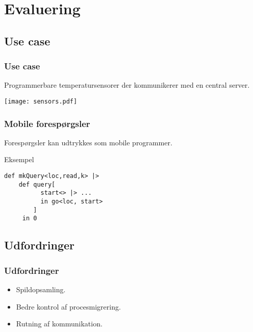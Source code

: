 \documentclass{beamer}
\begin{document}
\section{Evaluering}

\subsection{Use case}
\begin{frame}
\frametitle{Use case}
Programmerbare temperatursensorer der kommunikerer med en central server.
\begin{center}
\texttt{[image: sensors.pdf]}
\end{center}
\end{frame}

\begin{frame}[fragile]
\frametitle{Mobile forespørgsler}
Forespørgsler kan udtrykkes som mobile programmer.
\begin{block}{Eksempel}
\begin{lstlisting}
def mkQuery<loc,read,k> |>
    def query[
          start<> |> ...
          in go<loc, start>
        ]
     in 0
\end{lstlisting}
\end{block}
\end{frame}


\subsection{Udfordringer}
\begin{frame}
\frametitle{Udfordringer}
\begin{itemize}
 \item Spildopsamling.
 \item Bedre kontrol af procesmigrering.
 \item Rutning af kommunikation.
\end{itemize}
\end{frame}
\end{document}
